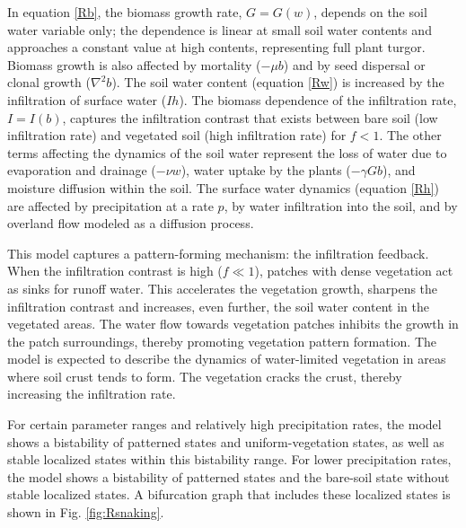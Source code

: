 \documentclass[aps,prl,preprint,superscriptaddress,floatfix]{revtex4-1}
\begin{document}
In equation \eqref{Rb}, the biomass growth rate, $G=G(w)$, depends on the soil water variable only; the dependence is linear at small soil water contents and approaches a constant value at high contents, representing full plant turgor. 
Biomass growth is also affected by mortality ($-\mu b$) and by seed dispersal or clonal growth ($\nabla^2 b$). 
The soil water content (equation \eqref{Rw}) is increased by the infiltration of surface water ($Ih$). 
The biomass dependence of the infiltration rate, $I=I(b)$, captures the infiltration contrast that exists between bare soil (low infiltration rate) and vegetated soil (high infiltration rate) for $f<1$.  
The other terms affecting the dynamics of the soil water represent the loss of water due to evaporation and drainage ($-\nu w$), water uptake by the plants ($-\gamma Gb$), and moisture diffusion within the soil.
The surface water dynamics (equation \eqref{Rh}) are affected by precipitation at a rate $p$, by water infiltration into the soil, and by overland flow modeled as a diffusion process.

This model captures a pattern-forming mechanism: the infiltration feedback. When the infiltration contrast is high ($f\ll 1$), patches with dense vegetation act as sinks for runoff water. 
This accelerates the vegetation growth, sharpens the infiltration contrast and increases, even further, the soil water content in the vegetated areas. 
The water flow towards vegetation patches inhibits the growth in the patch surroundings, thereby promoting vegetation pattern formation. The model is expected to describe the dynamics of water-limited vegetation in areas where soil crust tends to form. The vegetation cracks the crust, thereby increasing the infiltration rate. 

For certain parameter ranges and relatively high precipitation rates, the model shows a bistability of patterned states and uniform-vegetation states, as well as stable localized states within this bistability range. For lower precipitation rates, the model shows a bistability of patterned states and the bare-soil state without stable localized states.
A bifurcation graph that includes these localized states is shown in Fig. \ref{fig:Rsnaking}. 
\end{document}
